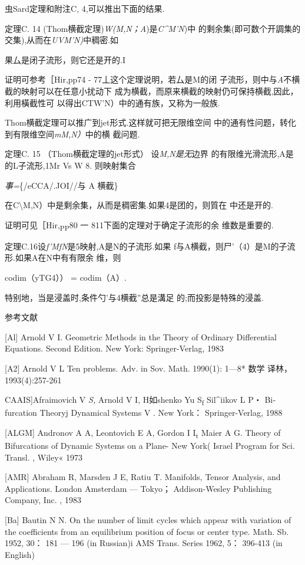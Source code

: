 虫Sard定理和附注C, 4,可以推出下面的结果.

定理C. 14 (Thom横截定理)\emph{W(M,N；A})是\emph{C\^{}M'N})中
的剩余集(即可数个开調集的交集),从而在\emph{UVM'N)}中稠密.如

果厶是闭子流形，则它还是开的.I

证明可参考［Hir,pp74 - 77丄这个定理说明，若厶是M的闭
子流形，则中与\emph{A}不横截的映射可以在任意小扰动下
成为横截，而原来横截的映射仍可保持横截,因此，利用橫截性可
以得出CTW'N）中的通有族，又称为一般族.

Thom横截定理可以推广到jet形式.这样就可把无限维空间
中的通有性问题，转化到有限维空间\emph{mM,N）}中的横 截问题.

定理C. 15 （Thom横截定理的jet形式） 设\emph{M,N是无}边界
的有限维光滑流形,A是的L子流形,1Mr Vs W 8. 则映射集合

\emph{事=}\{/eCCA/.JOI//与 A 横截\}

在C\textbackslash{}M,N）中是剩余集，从而是稠密集.如果4是团的，则質在
中还是开的.\textbar{}

证明可见［Hir,\textsubscript{PP}80 一 811下面的定理对于确定子流形的余
维数是重要的.

定理C.16设\emph{f'MfN}是5映射,A是N的子流形.如果
f与A横截，则尸'（4）是M的子流形.如果A在N中有有限余 维，则

codim（yTG4）） = codim（A）. \textbar{}

特别地，当是浸盖时,条件勺'与4横截''总是溝足 的;而投影是特殊的浸盖.

参考文献

{[}Al{]} Arnold V I. Geometric Methods in the Theory of Ordinary
Differential Equations. Second Edition. New York: Springer-Verlag, 1983

{[}A2{]} Arnold V L Ten problems. Adv. in Sov. Math. 1990(1): 1---8*
数学 译林，1993(4):257-261

CAAIS{]}Afraimovich V \emph{S,} Arnold V I, H如shenko Yu
S\textsubscript{f} Sil\^{}iikov L P・ Bi­furcation Theoryj Dynamical
Systems V . New York： Springer-Ver­lag, 1988

{[}ALGM{]} Andronov A A, Leontovich E A, Gordon I I\textsubscript{t}
Maier A G. Theory of Bifurcations of Dynamic Systems on a Plane- New
York( Israel Program for Sci. Transl. , Wiley« 1973

{[}AMR{]} Abraham R, Marsden J E, Ratiu T. Manifolds, Tensor Analysis,
and Applications. London Amsterdam --- Tokyo； Addison-Wesley Publishing
Company, Inc. , 1983

{[}Ba{]} Bautin N N. On the number of limit cycles which appear with
variation of the coefficients from an equilibrium position of focus or
center type. Math. Sb. 1952, 30： 181 --- 196 (in Russian)i AMS Trans.
Series 1962, 5： 396-413 (in English)

